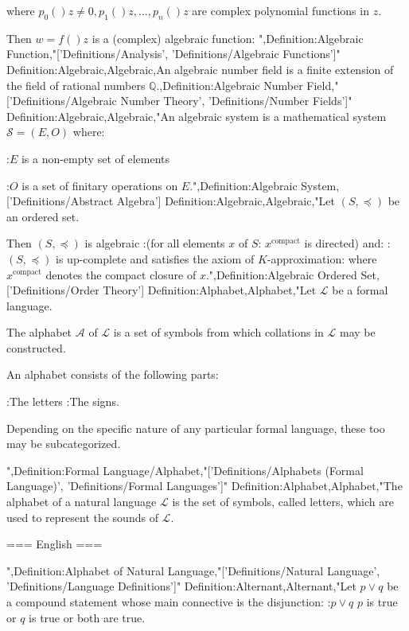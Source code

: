 where $p_0 \left(   \right)z \ne 0, p_1 \left(   \right)z, \dotsc, p_n \left(   \right)z$ are complex polynomial functions in $z$.


Then $w = f \left(   \right)z$ is a (complex) algebraic function:
",Definition:Algebraic Function,"['Definitions/Analysis', 'Definitions/Algebraic Functions']"
Definition:Algebraic,Algebraic,An algebraic number field is a finite extension of the field of rational numbers $\mathbb Q$.,Definition:Algebraic Number Field,"['Definitions/Algebraic Number Theory', 'Definitions/Number Fields']"
Definition:Algebraic,Algebraic,"An algebraic system is a mathematical system $\mathcal S = \left( E, O \right)$ where:

:$E$ is a non-empty set of elements

:$O$ is a set of finitary operations on $E$.",Definition:Algebraic System,['Definitions/Abstract Algebra']
Definition:Algebraic,Algebraic,"Let $\left( S, \preceq \right)$ be an ordered set.


Then $\left( S, \preceq \right)$ is algebraic 
:(for all elements $x$ of $S$: $x^{\mathrm{compact} }$ is directed)
and:
:$\left( S, \preceq \right)$ is up-complete and satisfies the axiom of $K$-approximation:
where $x^{\mathrm{compact} }$ denotes the compact closure of $x$.",Definition:Algebraic Ordered Set,['Definitions/Order Theory']
Definition:Alphabet,Alphabet,"Let $\mathcal L$ be a formal language.


The alphabet $\mathcal A$ of $\mathcal L$ is a set of symbols from which collations in $\mathcal L$ may be constructed.

An alphabet consists of the following parts:

:The letters
:The signs.

Depending on the specific nature of any particular formal language, these too may be subcategorized.







",Definition:Formal Language/Alphabet,"['Definitions/Alphabets (Formal Language)', 'Definitions/Formal Languages']"
Definition:Alphabet,Alphabet,"The alphabet of a natural language $\mathcal L$ is the set of symbols, called letters, which are used to represent the sounds of $\mathcal L$.


=== English ===

",Definition:Alphabet of Natural Language,"['Definitions/Natural Language', 'Definitions/Language Definitions']"
Definition:Alternant,Alternant,"Let $p \lor q$ be a compound statement whose main connective is the disjunction:
:$p \lor q$  $p$ is true or $q$ is true or both are true.


